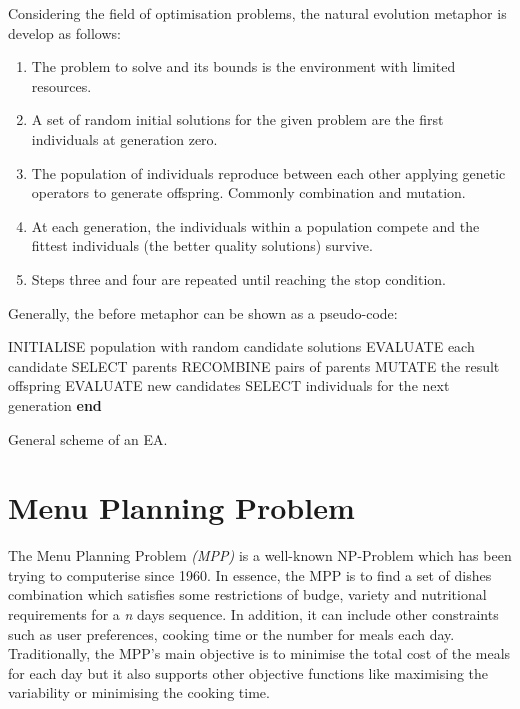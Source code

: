 Considering the field of optimisation problems, the natural evolution metaphor is develop as follows:
\begin{enumerate}
    \item The problem to solve and its bounds is the environment with limited resources.
    \item A set of random initial solutions for the given problem are the first individuals at generation zero. 
    \item The population of individuals reproduce between each other applying genetic operators to generate offspring. Commonly combination and mutation.
    \item At each generation, the individuals within a population compete and the fittest individuals (the better quality solutions) survive.
    \item Steps three and four are repeated until reaching the stop condition.
\end{enumerate}
Generally, the before metaphor can be shown as a pseudo-code\cite{eiben}:

\begin{algorithm}[!ht]
\begin{algorithmic}[1]
  \State INITIALISE population with random candidate solutions
  \State EVALUATE each candidate
    \State SELECT parents
    \State RECOMBINE pairs of parents
    \State MUTATE the result offspring
    \State EVALUATE new candidates
    \State SELECT individuals for the next generation 
  \EndWhile
  \State \textbf{end}
  \end{algorithmic}
  \caption{General scheme of an EA.}
\end{algorithm}

\newpage
\section{Menu Planning Problem}

The Menu Planning Problem \textit{(MPP)} is a well-known NP-Problem which has been trying to computerise since 1960\cite{Ngo2016}. In essence, the MPP is to find a set of dishes combination which satisfies some restrictions of budge, variety and nutritional requirements for a \textit{n} days sequence. In addition, it can include other constraints such as user preferences, cooking time or the number for meals each day.
Traditionally, the MPP's main objective is to minimise the total cost of the meals for each day\cite{Ngo2016, Moreira2018} but it also supports other objective functions like maximising the variability or minimising the cooking time.

